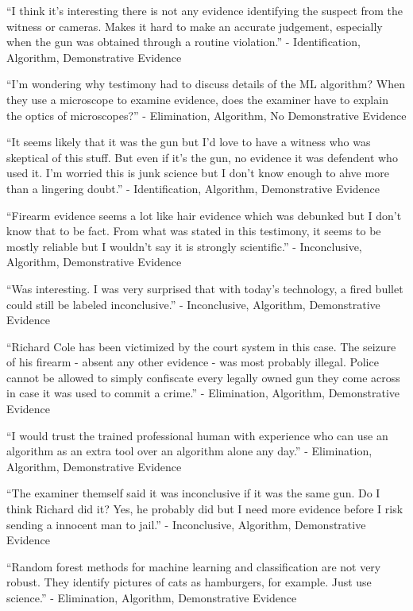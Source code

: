 \documentclass[print]{nuthesis}
\begin{document}
``I think it's interesting there is not any evidence identifying the suspect from the witness or cameras. Makes it hard to make an accurate judgement, especially when the gun was obtained through a routine violation.'' - Identification, Algorithm, Demonstrative Evidence

``I'm wondering why testimony had to discuss details of the ML algorithm? When they use a microscope to examine evidence, does the examiner have to explain the optics of microscopes?'' - Elimination, Algorithm, No Demonstrative Evidence

``It seems likely that it was the gun but I'd love to have a witness who was skeptical of this stuff. But even if it's the gun, no evidence it was defendent who used it. I'm worried this is junk science but I don't know enough to ahve more than a lingering doubt.'' - Identification, Algorithm, Demonstrative Evidence

``Firearm evidence seems a lot like hair evidence which was debunked but I don't know that to be fact. From what was stated in this testimony, it seems to be mostly reliable but I wouldn't say it is strongly scientific.'' - Inconclusive, Algorithm, Demonstrative Evidence

``Was interesting. I was very surprised that with today's technology, a fired bullet could still be labeled inconclusive.'' - Inconclusive, Algorithm, Demonstrative Evidence

``Richard Cole has been victimized by the court system in this case. The seizure of his firearm - absent any other evidence - was most probably illegal. Police cannot be allowed to simply confiscate every legally owned gun they come across in case it was used to commit a crime.'' - Elimination, Algorithm, Demonstrative Evidence

``I would trust the trained professional human with experience who can use an algorithm as an extra tool over an algorithm alone any day.'' - Elimination, Algorithm, Demonstrative Evidence

``The examiner themself said it was inconclusive if it was the same gun. Do I think Richard did it? Yes, he probably did but I need more evidence before I risk sending a innocent man to jail.'' - Inconclusive, Algorithm, Demonstrative Evidence

``Random forest methods for machine learning and classification are not very robust. They identify pictures of cats as hamburgers, for example. Just use science.'' - Elimination, Algorithm, Demonstrative Evidence
\end{document}
